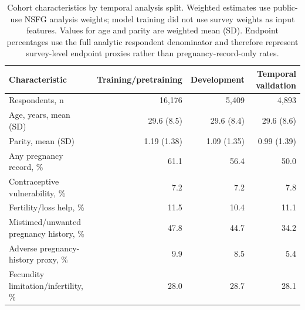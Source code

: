 \begin{table}[tbp]
\centering
\caption{Cohort characteristics by temporal analysis split. Weighted estimates use public-use NSFG analysis weights; model training did not use survey weights as input features. Values for age and parity are weighted mean (SD). Endpoint percentages use the full analytic respondent denominator and therefore represent survey-level endpoint proxies rather than pregnancy-record-only rates.}
\label{tab:cohort}
\footnotesize
\setlength{\tabcolsep}{4pt}
\begin{tabular*}{\textwidth}{@{\extracolsep{\fill}}>{\raggedright\arraybackslash}p{}rrr@{}}
\toprule
Characteristic & Training/pretraining & Development & Temporal validation \\
\midrule
Respondents, n & 16,176 & 5,409 & 4,893 \\
Age, years, mean (SD) & 29.6 (8.5) & 29.6 (8.4) & 29.6 (8.6) \\
Parity, mean (SD) & 1.19 (1.38) & 1.09 (1.35) & 0.99 (1.39) \\
Any pregnancy record, \% & 61.1 & 56.4 & 50.0 \\
Contraceptive vulnerability, \% & 7.2 & 7.2 & 7.8 \\
Fertility/loss help, \% & 11.5 & 10.4 & 11.1 \\
Mistimed/unwanted pregnancy history, \% & 47.8 & 44.7 & 34.2 \\
Adverse pregnancy-history proxy, \% & 9.9 & 8.5 & 5.4 \\
Fecundity limitation/infertility, \% & 28.0 & 28.7 & 28.1 \\
\bottomrule
\end{tabular*}
\end{table}
